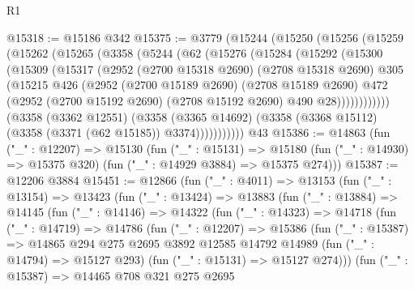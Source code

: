 \begin{lexlean}{R1}
\begin{coremodule}
@15318 := @15186 @342
@15375 := @3779
    (@15244
      (@15250
        (@15256
          (@15259
            (@15262
              (@15265
                (@3358
                  (@5244
                    (@62
                      (@15276
                        (@15284
                          (@15292
                            (@15300
                              (@15309
                                (@15317
                                  (@2952
                                    (@2700 @15318 @2690)
                                    (@2708 @15318 @2690)
                                    @305
                                    (@15215
                                      @426
                                      (@2952
                                        (@2700 @15189 @2690)
                                        (@2708 @15189 @2690)
                                        @472
                                        (@2952
                                          (@2700 @15192 @2690)
                                          (@2708 @15192 @2690)
                                          @490
                                          @28))))))))))))
                  (@3358
                    (@3362 @12551)
                    (@3358
                      (@3365 @14692)
                      (@3358 (@3368 @15112) (@3358 (@3371 (@62 @15185)) @3374)))))))))))
    @43
@15386 := @14863
    (fun ("_" : @12207) =>
    @15130
      (fun ("_" : @15131) =>
      @15180 (fun ("_" : @14930) => @15375 @320) (fun ("_" : @14929 @3884) => @15375 @274)))
@15387 := @12206 @3884
@15451 := @12866
    (fun ("_" : @4011) =>
    @13153
      (fun ("_" : @13154) =>
      @13423
        (fun ("_" : @13424) =>
        @13883
          (fun ("_" : @13884) =>
          @14145
            (fun ("_" : @14146) =>
            @14322
              (fun ("_" : @14323) =>
              @14718
                (fun ("_" : @14719) =>
                @14786
                  (fun ("_" : @12207) =>
                  @15386
                    (fun ("_" : @15387) =>
                    @14865
                      @294
                      @275
                      @2695
                      @3892
                      @12585
                      @14792
                      @14989
                      (fun ("_" : @14794) => @15127 @293)
                      (fun ("_" : @15131) => @15127 @274)))
                  (fun ("_" : @15387) =>
                  @14465
                    @708
                    @321
                    @275
                    @2695

\end{coremodule}
\end{lexlean}
